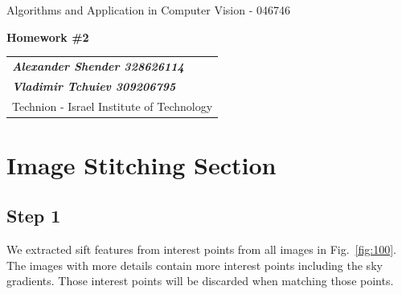 \documentclass[a4paper]{iacas}
\begin{document}
\begin{center}
 \large Algorithms and Application in Computer Vision - 046746
 \end{center}
\begin{center}
\large\textbf{Homework \#2}
 \end{center}


\begin{tabular}{l}
\\
{\bf\textit{Alexander Shender 328626114}} \\
{\bf\textit{Vladimir Tchuiev 309206795}} \\
Technion - Israel Institute of Technology
\end{tabular}

\vspace{2em}

\section{Image Stitching Section}

\subsection{Step 1}

We extracted sift features from interest points from all images in Fig.~\ref{fig:100}. The images with more details contain more interest points including the sky gradients. Those interest points will be discarded when matching those points.
\end{document}
